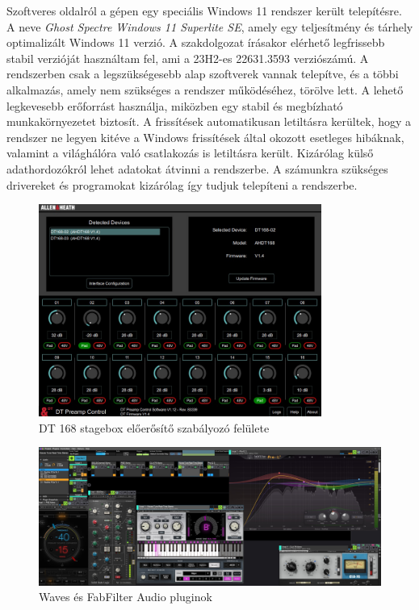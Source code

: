 Szoftveres oldalról a gépen egy speciális Windows 11 rendszer került telepítésre. A neve \textit{Ghost Spectre Windows 11 Superlite SE}, amely egy
teljesítmény és tárhely optimalizált Windows 11 verzió. A szakdolgozat írásakor elérhető legfrissebb stabil verzióját használtam fel, ami a
23H2-es 22631.3593 verziószámú.
A rendszerben csak a legszükségesebb alap szoftverek vannak telepítve, és a többi 
alkalmazás, amely nem szükséges a rendszer működéséhez, törölve lett. A lehető legkevesebb erőforrást használja, miközben egy stabil és megbízható
munkakörnyezetet biztosít. A frissítések automatikusan letiltásra kerültek, hogy a rendszer ne legyen kitéve a Windows frissítések által okozott
esetleges hibáknak, valamint a világhálóra való csatlakozás is letiltásra került. Kizárólag külső adathordozókról lehet adatokat átvinni a rendszerbe.
A számunkra szükséges drivereket és programokat kizárólag így tudjuk telepíteni a rendszerbe. 

\begin{figure}[H]
	\centering
	\includegraphics[width=350px, keepaspectratio]{figures/dt_preamp_control.jpg}
	\caption{DT 168 stagebox előerősítő szabályozó felülete}\label{fig:dt_preamp_control}
\end{figure}




\begin{figure}[H]
	\centering
	\includegraphics[width=\textwidth, keepaspectratio]{figures/waves_plugins.jpg}
	\caption{Waves és FabFilter Audio pluginok}\label{fig:waves_plugins}
\end{figure}


